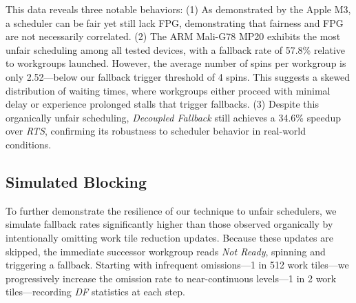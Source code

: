 \documentclass[sigconf,screen]{acmart}
\begin{document}
This data reveals three notable behaviors: (1) As demonstrated by the Apple M3, a scheduler can be fair yet still lack FPG, demonstrating that fairness and FPG are not necessarily correlated. (2) The ARM Mali-G78 MP20 exhibits the most unfair scheduling among all tested devices, with a fallback rate of 57.8\% relative to workgroups launched. However, the average number of spins per workgroup is only 2.52---below our fallback trigger threshold of 4 spins. This suggests a skewed distribution of waiting times, where workgroups either proceed with minimal delay or experience prolonged stalls that trigger fallbacks. (3) Despite this organically unfair scheduling, \emph{Decoupled Fallback} still achieves a 34.6\% speedup over \emph{RTS}, confirming its robustness to scheduler behavior in real-world conditions.

\subsection{Simulated Blocking}%
\label{sec:Sim-Blocking}
To further demonstrate the resilience of our technique to unfair schedulers, we simulate fallback rates significantly higher than those observed organically by intentionally omitting work tile reduction updates. Because these updates are skipped, the immediate successor workgroup reads \emph{Not Ready}, spinning and triggering a fallback. Starting with infrequent omissions---1 in 512 work tiles---we progressively increase the omission rate to near-continuous levels---1 in 2 work tiles---recording \emph{DF} statistics at each step.
\end{document}
